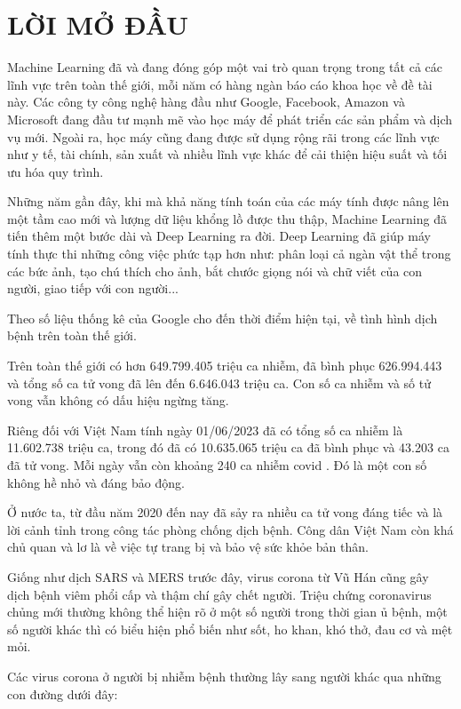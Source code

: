 \chapter*{LỜI MỞ ĐẦU}

\label{Chapter0} 

Machine Learning đã và đang đóng góp một vai trò quan trọng trong tất cả các lĩnh vực trên toàn thế giới, mỗi năm có hàng ngàn báo cáo khoa học về đề tài này. Các công ty công nghệ hàng đầu như Google, Facebook, Amazon và Microsoft đang đầu tư mạnh mẽ vào học máy để phát triển các sản phẩm và dịch vụ mới. Ngoài ra, học máy cũng đang được sử dụng rộng rãi trong các lĩnh vực như y tế, tài chính, sản xuất và nhiều lĩnh vực khác để cải thiện hiệu suất và tối ưu hóa quy trình.

Những năm gần đây, khi mà khả năng tính toán của các máy tính được nâng lên một tầm cao mới và lượng dữ liệu khổng lồ được thu thập, Machine Learning đã tiến thêm một bước dài và Deep Learning ra đời. Deep Learning đã giúp máy tính thực thi những công việc phức tạp hơn như: phân loại cả ngàn vật thể trong các bức ảnh, tạo chú thích cho ảnh, bắt chước giọng nói và chữ viết của con người, giao tiếp với con người...

Theo số liệu thống kê của Google cho đến thời điểm hiện tại, về tình hình dịch bệnh trên toàn thế giới. 

Trên toàn thế giới có hơn 649.799.405 triệu ca nhiễm, đã bình phục 626.994.443 và tổng số ca tử vong đã lên đến 6.646.043 triệu ca. Con số ca nhiễm và số tử vong vẫn không có dấu hiệu ngừng tăng.

Riêng đối với Việt Nam tính ngày 01/06/2023 đã có tổng số ca nhiễm là 11.602.738 triệu ca, trong đó đã có 10.635.065 triệu ca đã bình phục và 43.203 ca đã tử vong. Mỗi ngày vẫn còn khoảng 240 ca nhiễm covid .  Đó là một con số không hề nhỏ và đáng bảo động.

Ở nước ta, từ đầu năm 2020 đến nay đã sảy ra nhiều ca tử vong đáng tiếc và là lời cảnh tỉnh trong công tác phòng chống dịch bệnh. Công dân Việt Nam còn khá chủ quan và lơ là về việc tự trang bị và bảo vệ sức khỏe bản thân.

Giống như dịch SARS và MERS trước đây, virus corona từ Vũ Hán cũng gây dịch bệnh viêm phổi cấp và thậm chí gây chết người. Triệu chứng coronavirus chủng mới thường không thể hiện rõ ở một số người trong thời gian ủ bệnh, một số người khác thì có biểu hiện phổ biến như sốt, ho khan, khó thở, đau cơ và mệt mỏi.

Các virus corona ở người bị nhiễm bệnh thường lây sang người khác qua những con đường dưới đây:

